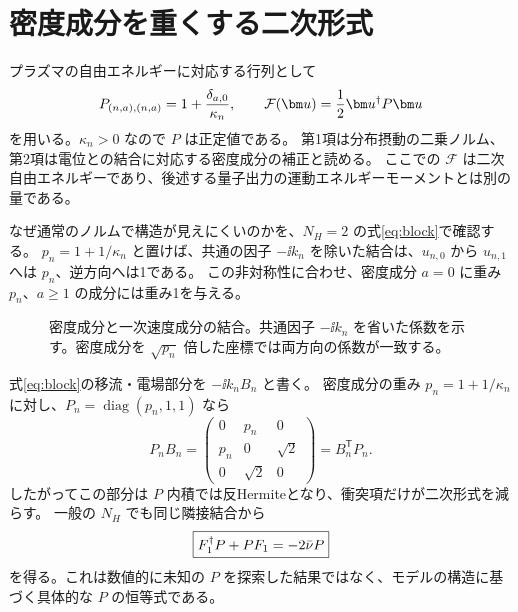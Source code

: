 \section{密度成分を重くする二次形式}
プラズマの自由エネルギーに対応する行列として
\begin{equation}
P_{(n,a),(n,a)}=1+\frac{\delta_{a,0}}{\kappa_n},\qquad
\mathcal F(\uu)=\frac12\uu^\dagger P\uu
\label{eq:pdef}
\end{equation}
を用いる。$\kappa_n>0$ なので $P$ は正定値である。
第1項は分布摂動の二乗ノルム、第2項は電位との結合に対応する密度成分の補正と読める。
ここでの $\mathcal F$ は二次自由エネルギーであり、後述する量子出力の運動エネルギーモーメントとは別の量である。

なぜ通常のノルムで構造が見えにくいのかを、$N_H=2$ の式\eqref{eq:block}で確認する。
$p_n=1+1/\kappa_n$ と置けば、共通の因子 $-\ii k_n$ を除いた結合は、$u_{n,0}$ から $u_{n,1}$ へは $p_n$、逆方向へは1である。
この非対称性に合わせ、密度成分 $a=0$ に重み $p_n$、$a\geq1$ の成分には重み1を与える。

\begin{figure}[htbp]
\centering

\caption{密度成分と一次速度成分の結合。共通因子 $-\ii k_n$ を省いた係数を示す。密度成分を $\sqrt{p_n}$ 倍した座標では両方向の係数が一致する。}
\label{fig:lyapunov-coupling}
\end{figure}

式\eqref{eq:block}の移流・電場部分を $-\ii k_nB_n$ と書く。
密度成分の重み $p_n=1+1/\kappa_n$ に対し、$P_n=\operatorname{diag}(p_n,1,1)$ なら
\[
P_nB_n=
\begin{pmatrix}0&p_n&0\\p_n&0&\sqrt2\\0&\sqrt2&0\end{pmatrix}
=B_n^{\mathsf T}P_n.
\]
したがってこの部分は $P$ 内積では反Hermiteとなり、衝突項だけが二次形式を減らす。
一般の $N_H$ でも同じ隣接結合から
\begin{equation}
\boxed{F_1^\dagger P+PF_1=-2\bar\nu P}
\label{eq:lyapeq}
\end{equation}
を得る。これは数値的に未知の $P$ を探索した結果ではなく、モデルの構造に基づく具体的な $P$ の恒等式である。

